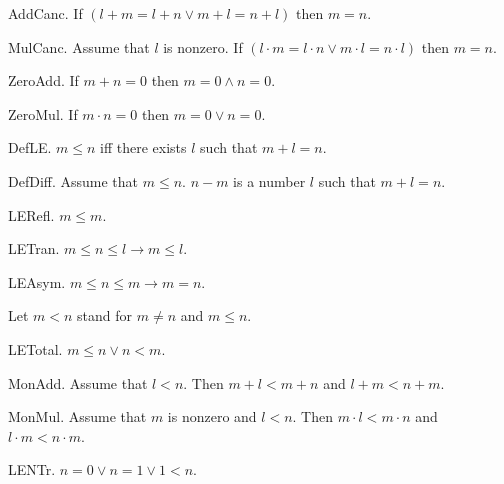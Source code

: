 \begin{axiom}
\begin{axiom} AddCanc.  
If $(l + m = l + n \vee m + l = n + l)$ then $m = n$.\end{axiom}

\begin{axiom} MulCanc.
Assume that $l$ is nonzero. If 
$(l \cdot m = l \cdot n \vee m \cdot l = n \cdot l)$ 
then $m = n$.\end{axiom}

\begin{axiom} ZeroAdd.
If $m + n = 0$ then $m = 0 \wedge n = 0$.\end{axiom}

\begin{lemma} ZeroMul.
If $m \cdot n = 0$ then $m = 0 \vee n = 0$.
\end{lemma}

\begin{definition} DefLE.
$m \leq n$ iff there exists $l$ such that $m + l = n$.
\end{definition}

\begin{definition} DefDiff.  Assume that $m \leq n$.
$n - m$ is a number $l$ such that $m + l = n$.
\end{definition}

\begin{lemma} LERefl. $m \leq m$. \end{lemma}
\begin{lemma} LETran. $m \leq n \leq l  \rightarrow  m \leq l$.
\begin{lemma} LEAsym. $m \leq n \leq m  \rightarrow  m = n$. 
\end{lemma}

Let $m < n$ stand for $m \neq n$ and $m \leq n$.

\begin{axiom} LETotal. $m \leq n \vee n < m$. \end{axiom}

\begin{lemma} MonAdd. Assume that $l < n$.
Then $m + l < m + n$ and $l + m < n + m$.
\end{lemma}

\begin{lemma} MonMul. Assume that $m$ is nonzero and $l < n$.
Then $m \cdot l < m \cdot n$ and $l \cdot m < n \cdot m$.
\end{lemma}

\begin{axiom} LENTr. 
$n = 0 \vee n = 1 \vee 1 < n$.\end{axiom}



\end{lemma}
\end{axiom}
